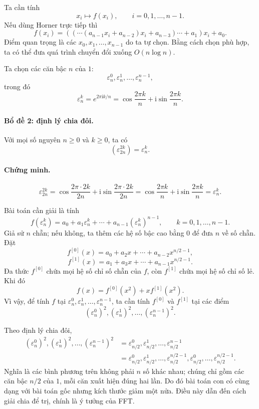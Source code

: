 \documentclass[11pt]{article}
\newcommand{\eps}{\varepsilon}
\newcommand{\ii}{\mathrm{i}}
\begin{document}
Ta cần tính
\[
  x_i\mapsto f(x_i),\qquad i=0,1,\ldots,n-1.
\]
Nếu dùng Horner trực tiếp thì
\[
  f(x_i)=((\cdots(a_{n-1}x_i+a_{n-2})x_i+a_{n-3})\cdots+a_1)x_i+a_0.
\]
Điểm quan trọng là các \(x_0,x_1,\ldots,x_{n-1}\) do ta tự chọn. Bằng cách
chọn phù hợp, ta có thể đưa quá trình chuyển đổi xuống \(O(n\log n)\).

Ta chọn các căn bậc \(n\) của \(1\):
\[
  \eps_n^0,\eps_n^1,\ldots,\eps_n^{n-1},
\]
trong đó
\[
  \eps_n^k=e^{2\pi\ii k/n}
  =\cos\frac{2\pi k}{n}+\ii\sin\frac{2\pi k}{n}.
\]

\paragraph{Bổ đề 2: định lý chia đôi.}
Với mọi số nguyên \(n\ge0\) và \(k\ge0\), ta có
\[
  \left(\eps_{2n}^{2k}\right)=\eps_n^k.
\]

\paragraph{Chứng minh.}
\[
  \eps_{2n}^{2k}
  =\cos\frac{2\pi\cdot2k}{2n}
   +\ii\sin\frac{2\pi\cdot2k}{2n}
  =\cos\frac{2\pi k}{n}
   +\ii\sin\frac{2\pi k}{n}
  =\eps_n^k.
\]

Bài toán cần giải là tính
\[
  f(\eps_n^k)=a_0+a_1\eps_n^k+\cdots+a_{n-1}(\eps_n^k)^{n-1},
  \qquad k=0,1,\ldots,n-1.
\]
Giả sử \(n\) chẵn; nếu không, ta thêm các hệ số bậc cao bằng \(0\) để đưa
\(n\) về số chẵn. Đặt
\[
  f^{[0]}(x)=a_0+a_2x+\cdots+a_{n-2}x^{n/2-1},
\]
\[
  f^{[1]}(x)=a_1+a_3x+\cdots+a_{n-1}x^{n/2-1}.
\]
Đa thức \(f^{[0]}\) chứa mọi hệ số chỉ số chẵn của \(f\), còn \(f^{[1]}\)
chứa mọi hệ số chỉ số lẻ. Khi đó
\[
  f(x)=f^{[0]}(x^2)+x f^{[1]}(x^2).
\]
Vì vậy, để tính \(f\) tại \(\eps_n^0,\eps_n^1,\ldots,\eps_n^{n-1}\), ta cần
tính \(f^{[0]}\) và \(f^{[1]}\) tại các điểm
\[
  (\eps_n^0)^2,(\eps_n^1)^2,\ldots,(\eps_n^{n-1})^2.
\]

Theo định lý chia đôi,
\[
\begin{aligned}
  (\eps_n^0)^2,(\eps_n^1)^2,\ldots,(\eps_n^{n-1})^2
  &=
  \eps_{n/2}^0,\eps_{n/2}^1,\ldots,\eps_{n/2}^{n-1}\\
  &=
  \eps_{n/2}^0,\eps_{n/2}^1,\ldots,\eps_{n/2}^{n/2-1},
  \eps_{n/2}^0,\ldots,\eps_{n/2}^{n/2-1}.
\end{aligned}
\]
Nghĩa là các bình phương trên không phải \(n\) số khác nhau; chúng chỉ gồm
các căn bậc \(n/2\) của \(1\), mỗi căn xuất hiện đúng hai lần. Do đó bài
toán con có cùng dạng với bài toán gốc nhưng kích thước giảm một nửa. Điều
này dẫn đến cách giải chia để trị, chính là ý tưởng của FFT.
\end{document}
